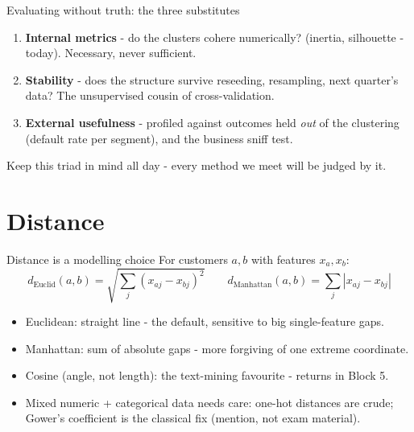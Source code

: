 \documentclass[10pt,aspectratio=169]{beamer}
\begin{document}
\begin{frame}{Evaluating without truth: the three substitutes}
  \begin{enumerate}
    \item \textbf{Internal metrics} - do the clusters cohere numerically?
          (inertia, silhouette - today). Necessary, never sufficient.
    \item \textbf{Stability} - does the structure survive reseeding,
          resampling, next quarter's data? The unsupervised cousin of
          cross-validation.
    \item \textbf{External usefulness} - profiled against outcomes held
          \emph{out} of the clustering (default rate per segment), and the
          business sniff test.
  \end{enumerate}
  \vspace{0.6em}
  \begin{center}
    Keep this triad in mind all day - every method we meet will be judged
    by it.
  \end{center}
\end{frame}

\section{Distance}

\begin{frame}{Distance is a modelling choice}
  For customers $a, b$ with features $x_{a}, x_{b}$:
  \[
    d_{\text{Euclid}}(a,b) = \sqrt{\textstyle\sum_j (x_{aj} - x_{bj})^2}
    \qquad
    d_{\text{Manhattan}}(a,b) = \textstyle\sum_j |x_{aj} - x_{bj}|
  \]
  \begin{itemize}\small
    \item Euclidean: straight line - the default, sensitive to big
          single-feature gaps.
    \item Manhattan: sum of absolute gaps - more forgiving of one extreme
          coordinate.
    \item Cosine (angle, not length): the text-mining favourite -
          returns in Block 5.
    \item Mixed numeric + categorical data needs care: one-hot distances
          are crude; Gower's coefficient is the classical fix (mention,
          not exam material).
  \end{itemize}
\end{frame}
\end{document}
